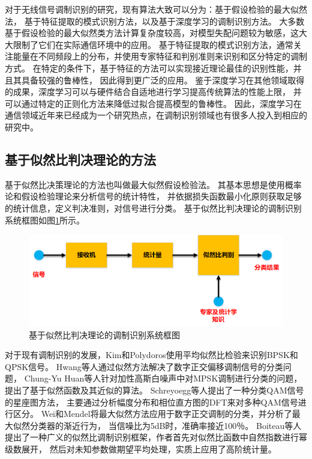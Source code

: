 对于无线信号调制识别的研究，现有算法大致可以分为：基于假设检验的最大似然法，
基于特征提取的模式识别方法，以及基于深度学习的调制识别方法。
大多数基于假设检验的最大似然类方法计算复杂度较高，对模型失配问题较为敏感，这大大限制了它们在实际通信环境中的应用。
基于特征提取的模式识别方法，通常关注能量在不同频段上的分布，并使用专家特征和判别准则来识别和区分特定的调制方式。
在特定的条件下，基于特征的方法可以实现接近理论最佳的识别性能，并且其具备较强的鲁棒性，
因此得到更广泛的应用。
鉴于深度学习在其他领域取得的成果，深度学习可以与硬件结合自适地进行学习提高传统算法的性能上限，
并可以通过特定的正则化方法来降低过拟合提高模型的鲁棒性。
因此，深度学习在通信领域近年来已经成为一个研究热点，在调制识别领域也有很多人投入到相应的研究中。\par

\subsection{基于似然比判决理论的方法}

基于似然比决策理论的方法也叫做最大似然假设检验法。 
其基本思想是使用概率论和假设检验理论来分析信号的统计特性，
并依据损失函数最小化原则获取足够的统计信息，定义判决准则，对信号进行分类。
基于似然比判决理论的调制识别系统框图如图\ref{sec:fig_1_0}所示。\par

\begin{figure}
	\centering
	\includegraphics[scale=0.55]{figures/chapter_1/fig_1_0}
	\caption{基于似然比判决理论的调制识别系统框图} \label{sec:fig_1_0}
\end{figure}

对于现有调制识别的发展，Kim和Polydoros使用平均似然比检验来识别BPSK和QPSK信号\cite{kim1988digital}。
Hwang等人通过似然方法解决了数字正交偏移调制信号的分类问题\cite{hwang1991advanced}，
Chung-Yu Huan等人针对加性高斯白噪声中对MPSK调制进行分类的问题，
提出了基于似然函数及其近似的算法\cite{huan1995likelihood}。
Schreyoegg等人提出了一种分类QAM信号的星座图方法，
主要通过分析幅度分布和相位直方图的DFT来对多种QAM信号进行区分\cite{Schreyogg2002Modulation}。 
Wei和Mendel将最大似然方法应用于数字正交调制的分类，并分析了最大似然分类器的渐近行为，
当信噪比为5dB时，准确率接近100％\cite{wei2000maximum}。
Boiteau等人提出了一种广义的似然比调制识别框架，作者首先对似然比函数中自然指数进行幂级数展开，
然后对未知参数做期望平均处理，实质上应用了高阶统计量\cite{boiteau1998general}。
\par

